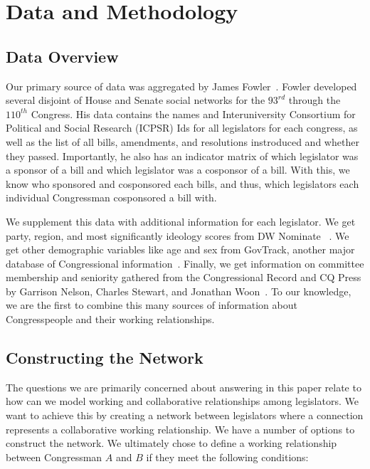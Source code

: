 \section{Data and Methodology}

\subsection{Data Overview}

Our primary source of data was aggregated by James Fowler~\cite{Fowler}. Fowler
developed several disjoint of House and Senate social networks for the $93^{rd}$
through the $110^{th}$ Congress. His data contains the names and Interuniversity
Consortium for Political and Social Research (ICPSR) Ids for all legislators for
each congress, as well as the list of all bills, amendments, and resolutions
instroduced and whether they passed. Importantly, he also has an indicator
matrix of which legislator was a sponsor of a bill and which legislator was a
cosponsor of a bill. With this, we know who sponsored and cosponsored each
bills, and thus,  which legislators each individual Congressman cosponsored a
bill with.

We supplement this data with additional information for each legislator. We get
party, region, and most significantly ideology scores from DW Nominate
~\cite{DW-NOMINATE}. We get other demographic variables like age and sex from
GovTrack, another major database of Congressional information~\cite{GovTrack}.
Finally, we get information on committee membership and seniority gathered from
the Congressional Record and CQ Press by Garrison Nelson, Charles Stewart, and
Jonathan Woon~\cite{Nelson, Stewart}. To our knowledge, we are the first to
combine this many sources of information about Congresspeople and their working
relationships.

\subsection{Constructing the Network}

The questions we are primarily concerned about answering in this paper relate 
to how can we model working and collaborative relationships among legislators. 
We want to achieve this by creating a network between legislators where a 
connection represents a collaborative working relationship. We have a number of 
options to construct the network. We ultimately chose to define a working 
relationship between Congressman $A$ and $B$ if they meet the following 
conditions:


